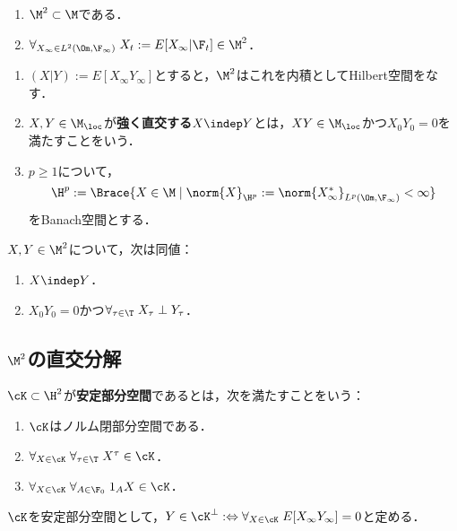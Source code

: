 \documentclass[uplatex,dvipdfmx]{jsreport}
\begin{document}
\begin{theorem}\mbox{}
    \begin{enumerate}
        \item $\M^2\subset\M$である．
        \item $\forall_{X_\infty\in L^2(\Om,\F_\infty)}\;X_t:=E[X_\infty|\F_t]\in\M^2$．
    \end{enumerate}
\end{theorem}

\begin{definition}\mbox{}
    \begin{enumerate}
        \item $(X|Y):=E[X_\infty Y_\infty]$とすると，$\M^2$はこれを内積としてHilbert空間をなす．
        \item $X,Y\in\M_\loc$が\textbf{強く直交する}$X\indep Y$とは，$XY\in\M_\loc$かつ$X_0Y_0=0$を満たすことをいう．
        \item $p\ge1$について，
        \[\H^p:=\Brace{X\in\M\mid\norm{X}_{\H^p}:=\norm{X^*_\infty}_{L^p(\Om,\F_\infty)}<\infty}\]
        をBanach空間とする．
    \end{enumerate}
\end{definition}

\begin{theorem}
    $X,Y\in\M^2$について，次は同値：
    \begin{enumerate}
        \item $X\indep Y$．
        \item $X_0Y_0=0$かつ$\forall_{\tau\in\T}\;X_\tau\perp Y_\tau$．
    \end{enumerate}
\end{theorem}

\subsection{$\M^2$の直交分解}

\begin{definition}
    $\cK\subset\H^2$が\textbf{安定部分空間}であるとは，次を満たすことをいう：
    \begin{enumerate}
        \item $\cK$はノルム閉部分空間である．
        \item $\forall_{X\in\cK}\;\forall_{\tau\in\T}\;X^\tau\in\cK$．
        \item $\forall_{X\in\cK}\;\forall_{A\in\F_0}\;1_AX\in\cK$．
    \end{enumerate}
    $\cK$を安定部分空間として，$Y\in\cK^\perp:\Leftrightarrow\forall_{X\in\cK}\;E[X_\infty Y_\infty]=0$と定める．
\end{definition}
\end{document}
